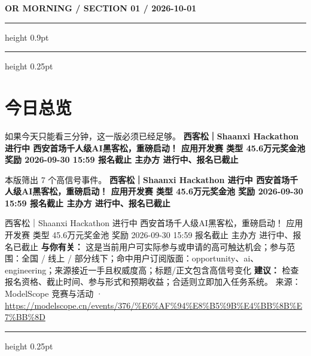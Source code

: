 \documentclass[10.5pt]{ctexart}
\begin{document}
{\small\bfseries OR MORNING / SECTION 01 / 2026-10-01}
\vspace{2mm}
\hrule height 0.9pt
\vspace{1.5mm}
\hrule height 0.25pt
\vspace{4mm}
\section*{今日总览}
{\color{ormuted} 如果今天只能看三分钟，这一版必须已经足够。}
\vspace{2mm}
{\fontsize{25}{29}\selectfont\bfseries 西客松｜Shaanxi Hackathon 进行中 西安首场千人级AI黑客松，重磅启动！ 应用开发赛 类型 45.6万元奖金池 奖励 2026-09-30 15:59 报名截止 主办方 进行中、报名已截止}\par
\vspace{2mm}
{\large 本版筛出 7 个高信号事件。}
\vspace{3mm}
{\Large\bfseries 西客松｜Shaanxi Hackathon 进行中 西安首场千人级AI黑客松，重磅启动！ 应用开发赛 类型 45.6万元奖金池 奖励 2026-09-30 15:59 报名截止 主办方 进行中、报名已截止}\par
西客松｜Shaanxi Hackathon 进行中 西安首场千人级AI黑客松，重磅启动！ 应用开发赛 类型 45.6万元奖金池 奖励 2026-09-30 15:59 报名截止 主办方 进行中、报名已截止
\textbf{与你有关：} 这是当前用户可实际参与或申请的高可触达机会；参与范围：全国 / 线上 / 部分线下；命中用户订阅版面：opportunity、ai、engineering；来源接近一手且权威度高；标题/正文包含高信号变化
\textbf{建议：} 检查报名资格、截止时间、参与形式和预期收益；合适则立即加入任务系统。
{\footnotesize\color{ormuted} 来源：ModelScope 竞赛与活动 · \url{https://modelscope.cn/events/376/%E6%AF%94%E8%B5%9B%E4%BB%8B%E7%BB%8D}}
\vspace{3mm}
\hrule height 0.25pt
\vspace{3mm}
\end{document}

